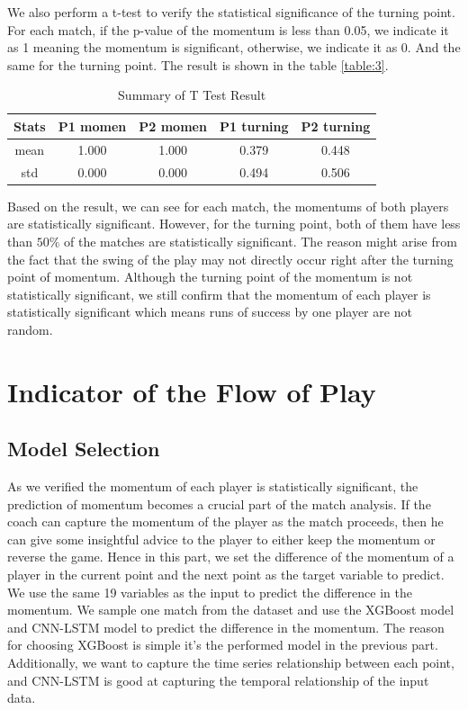 \documentclass[12pt]{article}
\begin{document}
We also perform a t-test to verify the statistical
significance of the turning point. For each match, if the p-value of the momentum is less than 0.05, we indicate it as 1 meaning the
momentum is significant, otherwise, we indicate it as 0. And the same for the turning point. The result is shown in the table \ref{table:3}.
\begin{table}[h!]
\centering
\begin{tabular}{|| c c c c c ||}
    \hline 
    \textbf{Stats} & \textbf{P1 momen} & \textbf{P2 momen} & \textbf{P1 turning} & \textbf{P2 turning} \\ [0.5ex] 
    \hline\hline
    mean & 1.000 & 1.000 & 0.379 & 0.448 \\
    \hline
    std & 0.000 & 0.000 & 0.494 & 0.506 \\
    [1ex]
    \hline
\end{tabular}
\caption{Summary of T Test Result}
\label{table:4}
\end{table}

Based on the result, we can see for each match, the momentums of both players are statistically significant. However, for the turning point,
both of them have less than $50\%$ of the matches are statistically significant. The reason might arise from the fact that the swing of the play
may not directly occur right after the turning point of momentum. Although the turning point of the momentum is not statistically significant, we 
still confirm that the momentum of each player is statistically significant which means runs of success by one player are not random.

\section{Indicator of the Flow of Play}
\subsection{Model Selection}
\quad As we verified the momentum of each player is statistically significant, the prediction of momentum becomes a crucial part of the match analysis.
If the coach can capture the momentum of the player as the match proceeds, then he can give some insightful advice to the player to either keep the momentum or 
reverse the game. Hence in this part, we set the difference of the momentum of a player in the current point and the next point as the target variable to predict.
We use the same 19 variables as the input to predict the difference in the momentum. We sample one match from the dataset and use the XGBoost model and CNN-LSTM\cite{graph-tennis} model to predict
the difference in the momentum. The reason for choosing XGBoost is simple it's the performed model in the previous part. Additionally, we want to capture the time series
relationship between each point, and CNN-LSTM is good at capturing the temporal relationship of the input data. 
\end{document}
